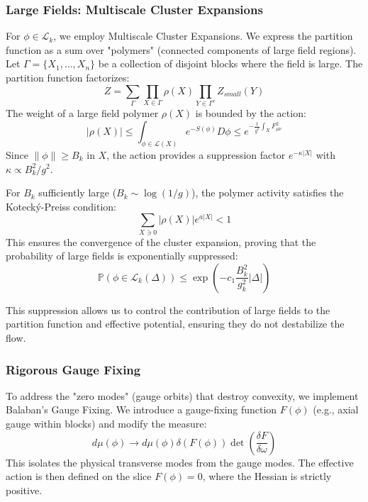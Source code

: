 \subsubsection{Large Fields: Multiscale Cluster Expansions}
For $\phi \in \mathcal{L}_k$, we employ Multiscale Cluster Expansions. We express the partition function as a sum over "polymers" (connected components of large field regions).
Let $\Gamma = \{X_1, \dots, X_n\}$ be a collection of disjoint blocks where the field is large. The partition function factorizes:
\begin{equation}
    Z = \sum_{\Gamma} \prod_{X \in \Gamma} \rho(X) \prod_{Y \in \Gamma^c} Z_{small}(Y)
\end{equation}
The weight of a large field polymer $\rho(X)$ is bounded by the action:
\begin{equation}
    |\rho(X)| \le \int_{\phi \in \mathcal{L}(X)} e^{-S(\phi)} D\phi \le e^{- \frac{1}{g^2} \int_X F_{\mu\nu}^2}
\end{equation}
Since $\|\phi\| \ge B_k$ in $X$, the action provides a suppression factor $e^{-\kappa |X|}$ with $\kappa \propto B_k^2/g^2$.
\begin{theorem}
For $B_k$ sufficiently large ($B_k \sim \log(1/g)$), the polymer activity satisfies the Kotecký-Preiss condition:
\begin{equation}
    \sum_{X \ni 0} |\rho(X)| e^{a|X|} < 1
\end{equation}
This ensures the convergence of the cluster expansion, proving that the probability of large fields is exponentially suppressed:
\begin{equation}
    \mathbb{P}(\phi \in \mathcal{L}_k(\Delta)) \le \exp\left( -c_1 \frac{B_k^2}{g_k^2} |\Delta| \right)
\end{equation}
\end{theorem}
This suppression allows us to control the contribution of large fields to the partition function and effective potential, ensuring they do not destabilize the flow.

\subsubsection{Rigorous Gauge Fixing}
To address the "zero modes" (gauge orbits) that destroy convexity, we implement Balaban’s Gauge Fixing. We introduce a gauge-fixing function $F(\phi)$ (e.g., axial gauge within blocks) and modify the measure:
\begin{equation}
    d\mu(\phi) \to d\mu(\phi) \delta(F(\phi)) \det\left(\frac{\delta F}{\delta \omega}\right)
\end{equation}
This isolates the physical transverse modes from the gauge modes. The effective action is then defined on the slice $F(\phi)=0$, where the Hessian is strictly positive.

